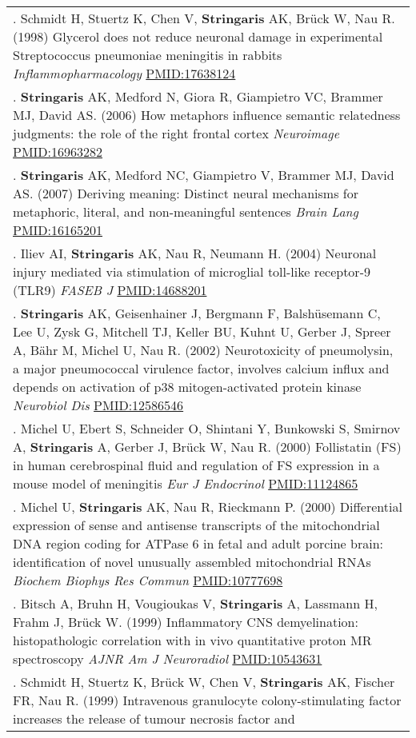 \documentclass[
]{article}
\begin{document}
\begin{longtable}[]{@{}
  >{\raggedright\arraybackslash}p{}@{}}
194. Schmidt H, Stuertz K, Chen V, \textbf{Stringaris} AK, Brück W, Nau
R. (1998) Glycerol does not reduce neuronal damage in experimental
Streptococcus pneumoniae meningitis in rabbits
\emph{Inflammopharmacology} \url{PMID:17638124} \\
195. \textbf{Stringaris} AK, Medford N, Giora R, Giampietro VC, Brammer
MJ, David AS. (2006) How metaphors influence semantic relatedness
judgments: the role of the right frontal cortex \emph{Neuroimage}
\url{PMID:16963282} \\
196. \textbf{Stringaris} AK, Medford NC, Giampietro V, Brammer MJ, David
AS. (2007) Deriving meaning: Distinct neural mechanisms for metaphoric,
literal, and non-meaningful sentences \emph{Brain Lang}
\url{PMID:16165201} \\
197. Iliev AI, \textbf{Stringaris} AK, Nau R, Neumann H. (2004) Neuronal
injury mediated via stimulation of microglial toll-like receptor-9
(TLR9) \emph{FASEB J} \url{PMID:14688201} \\
198. \textbf{Stringaris} AK, Geisenhainer J, Bergmann F, Balshüsemann C,
Lee U, Zysk G, Mitchell TJ, Keller BU, Kuhnt U, Gerber J, Spreer A, Bähr
M, Michel U, Nau R. (2002) Neurotoxicity of pneumolysin, a major
pneumococcal virulence factor, involves calcium influx and depends on
activation of p38 mitogen-activated protein kinase \emph{Neurobiol Dis}
\url{PMID:12586546} \\
199. Michel U, Ebert S, Schneider O, Shintani Y, Bunkowski S, Smirnov A,
\textbf{Stringaris} A, Gerber J, Brück W, Nau R. (2000) Follistatin (FS)
in human cerebrospinal fluid and regulation of FS expression in a mouse
model of meningitis \emph{Eur J Endocrinol} \url{PMID:11124865} \\
200. Michel U, \textbf{Stringaris} AK, Nau R, Rieckmann P. (2000)
Differential expression of sense and antisense transcripts of the
mitochondrial DNA region coding for ATPase 6 in fetal and adult porcine
brain: identification of novel unusually assembled mitochondrial RNAs
\emph{Biochem Biophys Res Commun} \url{PMID:10777698} \\
201. Bitsch A, Bruhn H, Vougioukas V, \textbf{Stringaris} A, Lassmann H,
Frahm J, Brück W. (1999) Inflammatory CNS demyelination: histopathologic
correlation with in vivo quantitative proton MR spectroscopy \emph{AJNR
Am J Neuroradiol} \url{PMID:10543631} \\
202. Schmidt H, Stuertz K, Brück W, Chen V, \textbf{Stringaris} AK,
Fischer FR, Nau R. (1999) Intravenous granulocyte colony-stimulating
factor increases the release of tumour necrosis factor and

\end{longtable}
\end{document}
